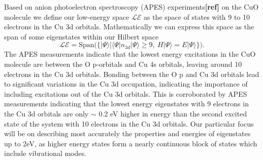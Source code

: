 \documentclass{article}
\begin{document}
Based on anion photoelectron spectroscopy (APES) experiments\textbf{[ref]} on the CuO molecule we define our low-energy space $\mathcal{LE}$ as the space of states with 9 to 10 electrons in the Cu 3d orbitals. 
Mathematically we can express this space as the span of some eigenstates within our Hilbert space
\begin{equation}
\mathcal{LE} = \text{Span(}\{ |\Psi \rangle | \langle \Psi | n_{3d} | \Psi \rangle \ge 9,\ H|\Psi\rangle = E |\Psi\rangle \}\text{)}.
\end{equation}
The APES measurements indicate that the lowest energy excitations in the CuO molecule are between the O p-orbitals and Cu 4s orbitals, leaving around 10 electrons in the Cu 3d orbitals. 
Bonding between the O p and Cu 3d orbitals lead to significant variations in the Cu 3d occupation, indicating the importance of including excitations out of the Cu 3d orbitals. 
This is corroborated by APES measurements indicating that the lowest energy eigenstates with 9 electrons in the Cu 3d orbitals are only $\sim$ 0.2 eV higher in energy than the second excited state of the system with 10 electrons in the Cu 3d orbitals. 
Our particular focus will be on describing most accurately the properties and energies of eigenstates up to 2eV, as higher energy states form a nearly continuous block of states which include vibrational modes.
\end{document}

